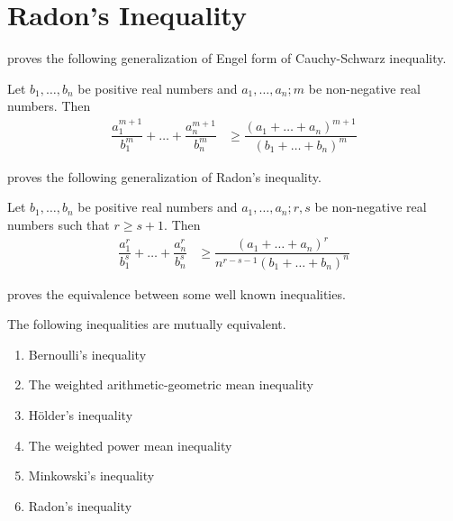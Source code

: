 \documentclass[inequalities.tex]{subfile}
\begin{document}
	\section{Radon's Inequality}\label{sec:radon}
	 \textcite{johann_radon_1913} proves the following generalization of Engel form of Cauchy-Schwarz inequality.
		\begin{theorem}
			Let $b_{1},\ldots,b_{n}$ be positive real numbers and $a_{1},\ldots,a_{n};m$ be non-negative real numbers. Then
				\begin{align*}
					\dfrac{a_{1}^{m+1}}{b_{1}^{m}}+\ldots+\dfrac{a_{n}^{m+1}}{b_{n}^{m}}
						& \geq \dfrac{(a_{1}+\ldots+a_{n})^{m+1}}{(b_{1}+\ldots+b_{n})^{m}}
				\end{align*}
		\end{theorem}
	\textcite{yang_2002} proves the following generalization of Radon's inequality.
		\begin{theorem}
			Let $b_{1},\ldots,b_{n}$ be positive real numbers and $a_{1},\ldots,a_{n};r,s$ be non-negative real numbers such that $r\geq s+1$. Then
				\begin{align*}
					\dfrac{a_{1}^{r}}{b_{1}^{s}}+\ldots+\dfrac{a_{n}^{r}}{b_{n}^{s}}
						& \geq \dfrac{(a_{1}+\ldots+a_{n})^{r}}{n^{r-s-1}(b_{1}+\ldots+b_{n})^{n}}
				\end{align*}
		\end{theorem}
	\textcite{yongtao_xian_xiao_2018} proves the equivalence between some well known inequalities.
		\begin{theorem}
			The following inequalities are mutually equivalent.
				\begin{enumerate}[\itshape i.]
					\item Bernoulli's inequality
					\item The weighted arithmetic-geometric mean inequality
					\item H\"{o}lder's inequality
					\item The weighted power mean inequality
					\item Minkowski's inequality
					\item Radon's inequality
				\end{enumerate}
		\end{theorem}
\end{document}
